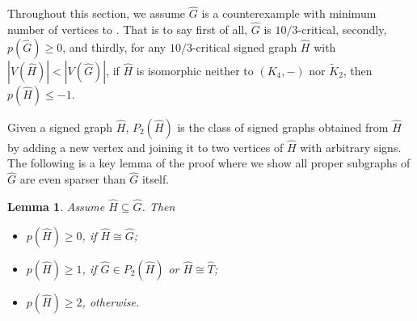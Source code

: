 \documentclass[11pt,a4paper]{article}
\newtheorem{lemma}[theorem]{Lemma}
\theoremstyle{definition}
\begin{document}
Throughout this section, we assume $\widehat{G}$ is a counterexample with minimum number of vertices to . That is to say first of all, $\widehat{G}$ is $10/3$-critical, secondly, $p(\widehat{G})\geq 0$, and thirdly, for any $10/3$-critical signed graph $\widehat{H}$ with $|V(\widehat{H})|<|V(\widehat{G})|$, if $\widehat{H}$ is isomorphic neither to $(K_4,-)$ nor $\widetilde{K}_2$, then $p(\widehat{H})\leq -1$. 


Given a signed graph $\widehat{H}$, $P_2(\widehat{H})$ is the class of signed graphs obtained from $\widehat{H}$ by adding a new vertex and joining it to two vertices of $\widehat{H}$ with arbitrary signs. The following is a key lemma of the proof where we show all proper subgraphs of $\widehat{G}$ are even sparser than $\widehat{G}$ itself.  

\begin{lemma}\label{lem:key}
	Assume $\widehat{H}\subseteq \widehat{G}$. Then 
	\begin{itemize}
		\item[(I)] $p(\widehat{H})\ge 0$, if $\widehat{H} \cong \widehat{G}$;
		\item[(II)] $p(\widehat{H})\ge 1$, if $\widehat{G}\in P_2(\widehat{H})$ or 
		$\widehat{H}\cong \widehat{T}$;
		\item[(III)] $p(\widehat{H})\ge 2$, otherwise.
	\end{itemize}
\end{lemma}
\end{document}
